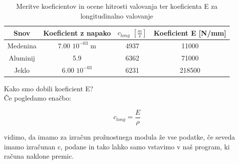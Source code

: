 \documentclass[11pt, a4paper]{article}
\theoremstyle{definition}
\theoremstyle{example}
\theoremstyle{izrek}
\begin{document}
\begin{table}[ht]
	\centering
	\begin{tabular}{|c|c|c|c|}
	\hline 
	Snov & Koeficient z napako & $c_{long}$ $[\frac{m}{s}]$ & Koeficient E [N/mm]\\ [1ex] 
	\hline 
	\hline 
	 Medenina & 7.00 $10^{-03}$ m& 4937 & 11000  \\ [0.5ex] 
	\hline 
	Aluminij & 5.9 & 6362 & 71000 \\[0.5ex] 
	\hline 
	Jeklo& 6.00  $10^{-03}$ & 6231 & 218500 \\[0.5ex] 
	\hline 
		\end{tabular}
		\caption{Meritve koeficientov in ocene hitrosti valovanja ter koeficienta E za longitudinalno valovanje}
		\label{tab:FirstTable}
\end{table}

Kako smo dobili koeficient E? \\

Če pogledamo enačbo:

$$c_{long}=\frac{E}{\rho}$$

vidimo, da imamo za izračun prožnostnega modula že vse podatke, če seveda imamo izračunan c, podane in tako lahko samo vstavimo v naš program, ki računa naklone premic. \\
\medskip
\end{document}
